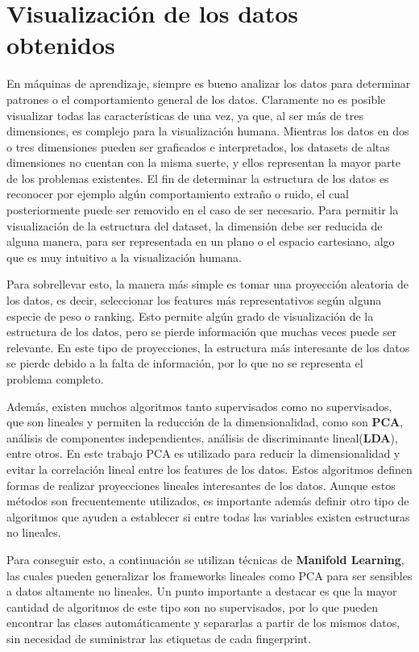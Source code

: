 \section{Visualización de los datos obtenidos}

En máquinas de aprendizaje, siempre es bueno analizar los datos para determinar patrones o el comportamiento general de los datos. Claramente no es posible visualizar todas las características de una vez, ya que, al ser más de tres dimensiones, es complejo para la visualización humana. Mientras los datos en dos o tres dimensiones pueden ser graficados e interpretados, los datasets de altas dimensiones no cuentan con la misma suerte, y ellos representan la mayor parte de los problemas existentes. El fin de determinar la estructura de los datos es reconocer por ejemplo algún comportamiento extraño o ruido, el cual posteriormente puede ser removido en el caso de ser necesario. Para permitir la visualización de la estructura del dataset, la dimensión debe ser reducida de alguna manera, para ser representada en un plano o el espacio cartesiano, algo que es muy intuitivo a la visualización humana.

Para sobrellevar esto, la manera más simple es tomar una proyección aleatoria de los datos, es decir, seleccionar los features más representativos según alguna especie de peso o ranking. Esto permite algún grado de visualización de la estructura de los datos, pero se pierde información que muchas veces puede ser relevante. En este tipo de proyecciones, la estructura más interesante de los datos se pierde debido a la falta de información, por lo que no se representa el problema completo.

Además, existen muchos algoritmos tanto supervisados como no supervisados, que son lineales y permiten la reducción de la dimensionalidad, como son \textbf{PCA}, análisis de componentes independientes, análisis de discriminante lineal(\textbf{LDA}), entre otros. En este trabajo PCA es utilizado para reducir la dimensionalidad y evitar la correlación lineal entre los features de los datos. Estos algoritmos definen formas de realizar proyecciones lineales interesantes de los datos. Aunque estos métodos son frecuentemente utilizados, es importante además definir otro tipo de algoritmos que ayuden a establecer si entre todas las variables existen estructuras no lineales.

Para conseguir esto, a continuación se utilizan técnicas de \textbf{Manifold Learning}, las cuales pueden generalizar los frameworks lineales como PCA para ser sensibles a datos altamente no lineales. Un punto importante a destacar es que la mayor cantidad de algoritmos de este tipo son no supervisados, por lo que pueden encontrar las clases automáticamente y separarlas a partir de los mismos datos, sin necesidad de suministrar las etiquetas de cada fingerprint.

